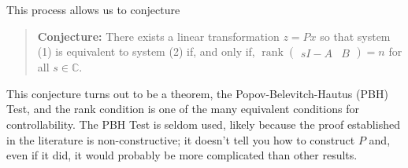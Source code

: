 %
This process allows us to conjecture
%
\begin{quote}
  \textbf{Conjecture:}
  There exists a linear transformation \(z = P x\) so that system (1) is equivalent to system (2) if, and only if,
  \(
    \operatorname{rank}\left(
      \begin{array}{l|l}
        s I - A & B
      \end{array}
    \right)
    =
    n
  \)
  for all \(s \in \mathbb{C}.\)
\end{quote}
This conjecture turns out to be a theorem, the Popov-Belevitch-Hautus (PBH) Test, and the rank condition is one of the many equivalent conditions for controllability.
The PBH Test is seldom used, likely because the proof established in the literature is non-constructive;
it doesn't tell you how to construct \(P\) and, even if it did, it would probably be more complicated than other results.

